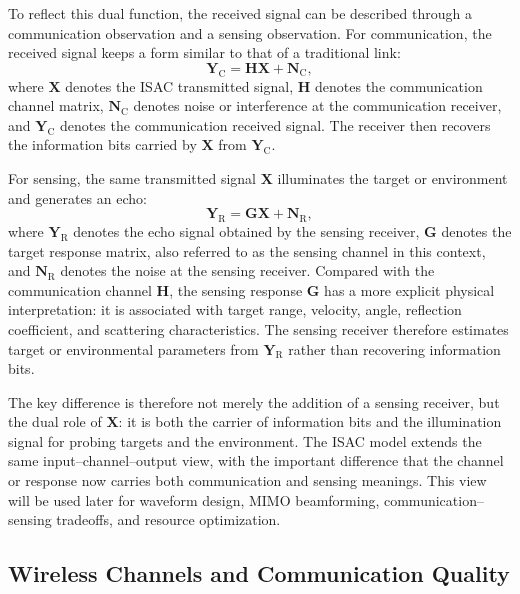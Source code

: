 To reflect this dual function, the received signal can be described through a
communication observation and a sensing observation.
For communication, the received signal keeps a form similar to that of a
traditional link:
\begin{equation}
    \mathbf{Y}_{\mathrm{C}}
    =
    \mathbf{H}\mathbf{X}
    +
    \mathbf{N}_{\mathrm{C}},
    \label{eq:isac_communication_model}
\end{equation}
where \(\mathbf{X}\) denotes the ISAC transmitted signal,
\(\mathbf{H}\) denotes the communication channel matrix,
\(\mathbf{N}_{\mathrm{C}}\) denotes noise or interference at the communication receiver,
and \(\mathbf{Y}_{\mathrm{C}}\) denotes the communication received signal.
The receiver then recovers the information bits carried by \(\mathbf{X}\) from
\(\mathbf{Y}_{\mathrm{C}}\).

For sensing, the same transmitted signal \(\mathbf{X}\) illuminates the target
or environment and generates an echo:
\begin{equation}
    \mathbf{Y}_{\mathrm{R}}
    =
    \mathbf{G}\mathbf{X}
    +
    \mathbf{N}_{\mathrm{R}},
    \label{eq:isac_sensing_model}
\end{equation}
where \(\mathbf{Y}_{\mathrm{R}}\) denotes the echo signal obtained by the sensing receiver,
\(\mathbf{G}\) denotes the target response matrix,
also referred to as the sensing channel in this context,
and \(\mathbf{N}_{\mathrm{R}}\) denotes the noise at the sensing receiver.
Compared with the communication channel \(\mathbf{H}\),
the sensing response \(\mathbf{G}\) has a more explicit physical interpretation:
it is associated with target range,
velocity,
angle,
reflection coefficient,
and scattering characteristics.
The sensing receiver therefore estimates target or environmental parameters
from \(\mathbf{Y}_{\mathrm{R}}\) rather than recovering information bits.

The key difference is therefore not merely the addition of a sensing receiver,
but the dual role of \(\mathbf{X}\): it is both the carrier of information bits
and the illumination signal for probing targets and the environment.
The ISAC model extends the same input--channel--output view, with the important
difference that the channel or response now carries both communication and
sensing meanings.
This view will be used later for waveform design, MIMO beamforming,
communication--sensing tradeoffs, and resource optimization.


\subsection{Wireless Channels and Communication Quality}

